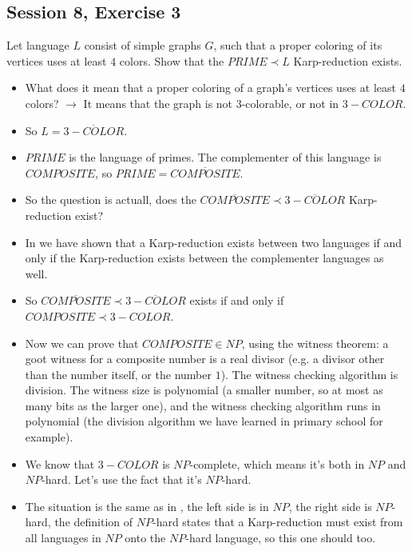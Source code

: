 \subsection {Session 8, Exercise 3}
\label{8_3}


Let language $L$ consist of simple graphs $G$, such that a proper coloring of its vertices uses at least $4$ colors. Show that the $PRIME \prec L$ Karp-reduction exists.


\begin{itemize}
    \item What does it mean that a proper coloring of a graph's vertices uses at least $4$ colors? $\rightarrow$ It means that the graph is not 3-colorable, or not in $3-COLOR$.
    \item So $L = \overline{3-COLOR}$.
    \item $PRIME$ is the language of primes. The complementer of this language is $COMPOSITE$, so $PRIME = \overline{COMPOSITE}$.
    \item So the question is actuall, does the $\overline{COMPOSITE} \prec \overline{3-COLOR}$ Karp-reduction exist?
    \item In  we have shown that a Karp-reduction exists between two languages if and only if the Karp-reduction exists between the complementer languages as well.
    \item So $\overline{COMPOSITE} \prec \overline{3-COLOR}$ exists if and only if $COMPOSITE \prec 3-COLOR$.
    \item Now we can prove that $COMPOSITE \in{} NP$, using the witness theorem: a goot witness for a composite number is a real divisor (e.g. a divisor other than the number itself, or the number $1$). The witness checking algorithm is division. The witness size is polynomial (a smaller number, so at most as many bits as the larger one), and the witness checking algorithm runs in polynomial (the division algorithm we have learned in primary school for example).
    \item We know that $3-COLOR$ is $NP$-complete, which means it's both in $NP$ and $NP$-hard. Let's use the fact that it's $NP$-hard.
    \item The situation is the same as in , the left side is in $NP$, the right side is $NP$-hard, the definition of $NP$-hard states that a Karp-reduction must exist from all languages in $NP$ onto the $NP$-hard language, so this one should too.
\end{itemize}

